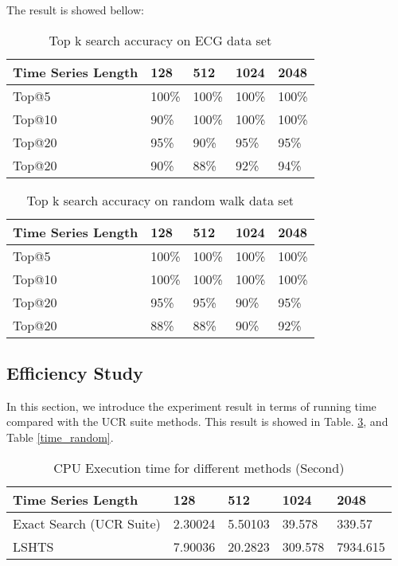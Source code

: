 \documentclass{article}
\begin{document}
The result is showed bellow:

\begin{table}[t]
  \caption{Top k search accuracy on ECG data set}
  \label{accuracy_ecg}
  \centering
  \begin{tabular}{lllll}
    \toprule
    Time Series Length     & 128     & 512  & 1024  & 2048\\
    \midrule
    Top@5 & 100\%  & 100\% & 100\% & 100\%     \\
    Top@10 & 90\%  & 100\% & 100\% & 100\%     \\
    Top@20 & 95\%  & 90\% & 95\% & 95\%     \\
    Top@20 & 90\%  & 88\% & 92\% & 94\%     \\
    \bottomrule
  \end{tabular}
\end{table}

\begin{table}[t]
  \caption{Top k search accuracy on random walk data set}
  \label{accuracy_random}
  \centering
  \begin{tabular}{lllll}
    \toprule
    Time Series Length     & 128     & 512  & 1024  & 2048\\
    \midrule
    Top@5 & 100\%  & 100\% & 100\% & 100\%     \\
    Top@10 & 100\%  & 100\% & 100\% & 100\%     \\
    Top@20 & 95\%  & 95\% & 90\% & 95\%     \\
    Top@20 & 88\%  & 88\% & 90\% & 92\%     \\
    \bottomrule
  \end{tabular}
\end{table}

\subsection{Efficiency Study}

In this section, we introduce the experiment result in terms of running time compared with the UCR suite methods. This result is showed in Table. \ref{time_ecg}, and Table \ref{time_random}.

\begin{table}[t]
  \caption{CPU Execution time for different methods (Second)}
  \label{time_ecg}
  \centering
  \begin{tabular}{lllll}
    \toprule
    Time Series Length     & 128     & 512  & 1024  & 2048\\
    \midrule
    Exact Search (UCR Suite) & 2.30024  & 5.50103 & 39.578 & 339.57     \\
    LSHTS &  7.90036  & 20.2823 &  309.578 & 7934.615     \\
    \bottomrule
  \end{tabular}
\end{table}
\end{document}
